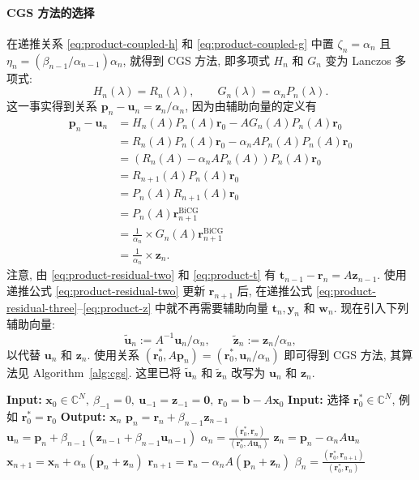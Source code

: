 \paragraph{{CGS 方法的选择}}\label{subsec:cgs-parameter-choice}\mbox{}\par
{在递推关系 \eqref{eq:product-coupled-h} 和 \eqref{eq:product-coupled-g} 中置 $\zeta_n=\alpha_n$ 且 $\eta_n=(\beta_{n-1}/\alpha_{n-1})\alpha_n$, 就得到 CGS 方法, 即多项式 $H_n$ 和 $G_n$ 变为 Lanczos 多项式:}
\[H_n(\lambda)=R_n(\lambda),\qquad G_n(\lambda)=\alpha_nP_n(\lambda).\]
{这一事实得到关系 $\bm p_n-\bm u_n=\bm z_n/\alpha_n$, 因为由辅助向量的定义有}
\[\begin{aligned}\bm p_n-\bm u_n&=H_n(A)P_n(A)\bm r_0-AG_n(A)P_n(A)\bm r_0\\&=R_n(A)P_n(A)\bm r_0-\alpha_nAP_n(A)P_n(A)\bm r_0\\&=(R_n(A)-\alpha_nAP_n(A))P_n(A)\bm r_0\\&=R_{n+1}(A)P_n(A)\bm r_0\\&=P_n(A)R_{n+1}(A)\bm r_0\\&=P_n(A)\bm r_{n+1}^{\mathrm{BiCG}}\\&=\frac1{\alpha_n}\times G_n(A)\bm r_{n+1}^{\mathrm{BiCG}}\\&=\frac1{\alpha_n}\times\bm z_n.\end{aligned}\]
{注意, 由 \eqref{eq:product-residual-two} 和 \eqref{eq:product-t} 有 $\bm t_{n-1}-\bm r_n=A\bm z_{n-1}$. 使用递推公式 \eqref{eq:product-residual-two} 更新 $\bm r_{n+1}$ 后, 在递推公式 \eqref{eq:product-residual-three}--\eqref{eq:product-z} 中就不再需要辅助向量 $\bm t_n,\bm y_n$ 和 $\bm w_n$. 现在引入下列辅助向量:}
\[\widetilde{\bm u}_n:=A^{-1}\bm u_n/\alpha_n,\qquad\widetilde{\bm z}_n:=\bm z_n/\alpha_n,\]
{以代替 $\bm u_n$ 和 $\bm z_n$. 使用关系 $(\bm r_0^{*},A\bm p_n)=(\bm r_0^{*},\bm u_n/\alpha_n)$ 即可得到 CGS 方法, 其算法见 Algorithm\ \ref{alg:cgs}. 这里已将 $\widetilde{\bm u}_n$ 和 $\widetilde{\bm z}_n$ 改写为 $\bm u_n$ 和 $\bm z_n$.}
\begin{algorithm}[H]\caption{{CGS 方法}}\label{alg:cgs}\begin{algorithmic}[1]
\Statex\textbf{Input:} $\bm x_0\in\mathbb C^N,\ \beta_{-1}=0,\ \bm u_{-1}=\bm z_{-1}=\bm0,\ \bm r_0=\bm b-A\bm x_0$
\Statex\textbf{Input:} {选择 $\bm r_0^{*}\in\mathbb C^N$, 例如 $\bm r_0^{*}=\bm r_0$}
\Statex\textbf{Output:} $\bm x_n$
\State $\bm p_n=\bm r_n+\beta_{n-1}\bm z_{n-1}$
\State $\bm u_n=\bm p_n+\beta_{n-1}(\bm z_{n-1}+\beta_{n-1}\bm u_{n-1})$
\State $\alpha_n=\frac{(\bm r_0^{*},\bm r_n)}{(\bm r_0^{*},A\bm u_n)}$
\State $\bm z_n=\bm p_n-\alpha_nA\bm u_n$
\State $\bm x_{n+1}=\bm x_n+\alpha_n(\bm p_n+\bm z_n)$
\State $\bm r_{n+1}=\bm r_n-\alpha_nA(\bm p_n+\bm z_n)$
\State $\beta_n=\frac{(\bm r_0^{*},\bm r_{n+1})}{(\bm r_0^{*},\bm r_n)}$
\EndFor\end{algorithmic}\end{algorithm}
